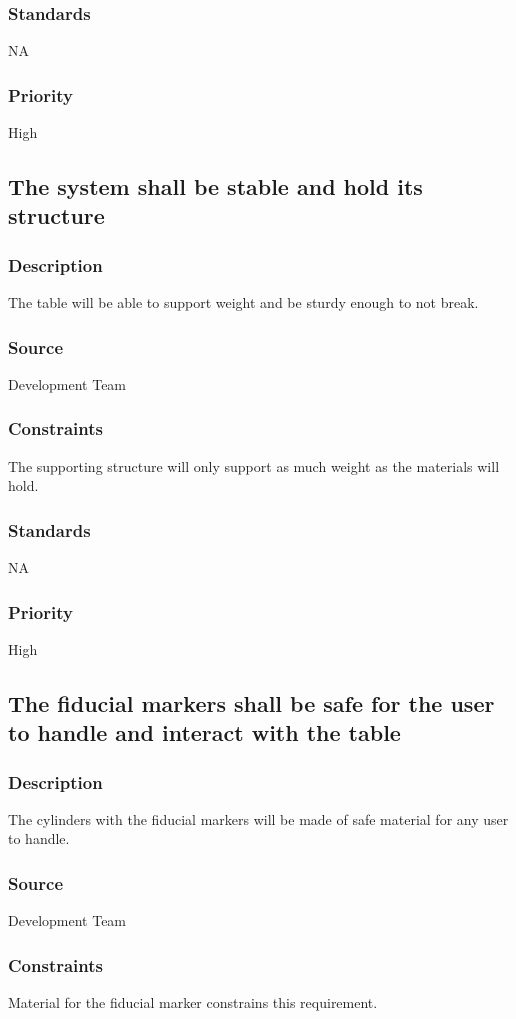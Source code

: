 \subsubsection{Standards}
NA
\subsubsection{Priority}
High

\subsection{The system shall be stable and hold its structure }
\subsubsection{Description}
The table will be able to support weight and be sturdy enough to not break.
\subsubsection{Source}
Development Team
\subsubsection{Constraints}
The supporting structure will only support as much weight as the materials will hold. 
\subsubsection{Standards}
NA
\subsubsection{Priority}
High

\subsection{The fiducial markers shall be safe for the user to handle and interact with the table }
\subsubsection{Description}
The cylinders with the fiducial markers will be made of safe material for any user to handle.
\subsubsection{Source}
Development Team
\subsubsection{Constraints}
Material for the fiducial marker constrains this requirement.
